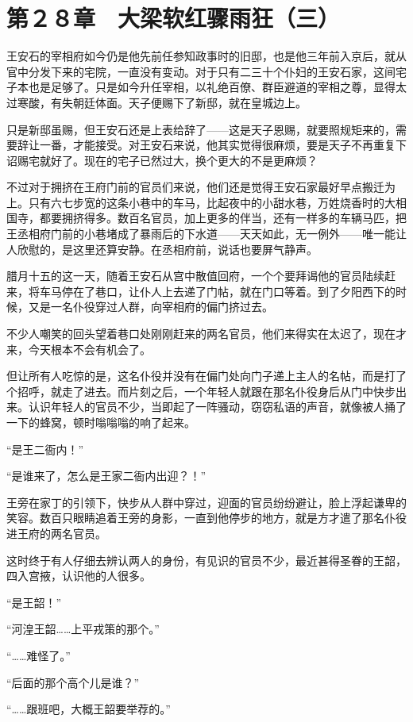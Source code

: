 \section{第２８章　大梁软红骤雨狂（三）}

王安石的宰相府如今仍是他先前任参知政事时的旧邸，也是他三年前入京后，就从官中分发下来的宅院，一直没有变动。对于只有二三十个仆妇的王安石家，这间宅子本也是足够了。只是如今升任宰相，以礼绝百僚、群臣避道的宰相之尊，显得太过寒酸，有失朝廷体面。天子便赐下了新邸，就在皇城边上。

只是新邸虽赐，但王安石还是上表给辞了——这是天子恩赐，就要照规矩来的，需要辞让一番，才能接受。对王安石来说，他其实觉得很麻烦，要是天子不再重复下诏赐宅就好了。现在的宅子已然过大，换个更大的不是更麻烦？

不过对于拥挤在王府门前的官员们来说，他们还是觉得王安石家最好早点搬迁为上。只有六七步宽的这条小巷中的车马，比起夜中的小甜水巷，万姓烧香时的大相国寺，都要拥挤得多。数百名官员，加上更多的伴当，还有一样多的车辆马匹，把王丞相府门前的小巷堵成了暴雨后的下水道——天天如此，无一例外——唯一能让人欣慰的，是这里还算安静。在丞相府前，说话也要屏气静声。

腊月十五的这一天，随着王安石从宫中散值回府，一个个要拜谒他的官员陆续赶来，将车马停在了巷口，让仆人上去递了门帖，就在门口等着。到了夕阳西下的时候，又是一名仆役穿过人群，向宰相府的偏门挤过去。

不少人嘲笑的回头望着巷口处刚刚赶来的两名官员，他们来得实在太迟了，现在才来，今天根本不会有机会了。

但让所有人吃惊的是，这名仆役并没有在偏门处向门子递上主人的名帖，而是打了个招呼，就走了进去。而片刻之后，一个年轻人就跟在那名仆役身后从门中快步出来。认识年轻人的官员不少，当即起了一阵骚动，窃窃私语的声音，就像被人捅了一下的蜂窝，顿时嗡嗡嗡的响了起来。

“是王二衙内！”

“是谁来了，怎么是王家二衙内出迎？！”

王旁在家丁的引领下，快步从人群中穿过，迎面的官员纷纷避让，脸上浮起谦卑的笑容。数百只眼睛追着王旁的身影，一直到他停步的地方，就是方才遣了那名仆役进王府的两名官员。

这时终于有人仔细去辨认两人的身份，有见识的官员不少，最近甚得圣眷的王韶，四入宫掖，认识他的人很多。

“是王韶！”

“河湟王韶……上平戎策的那个。”

“……难怪了。”

“后面的那个高个儿是谁？”

“……跟班吧，大概王韶要举荐的。”

